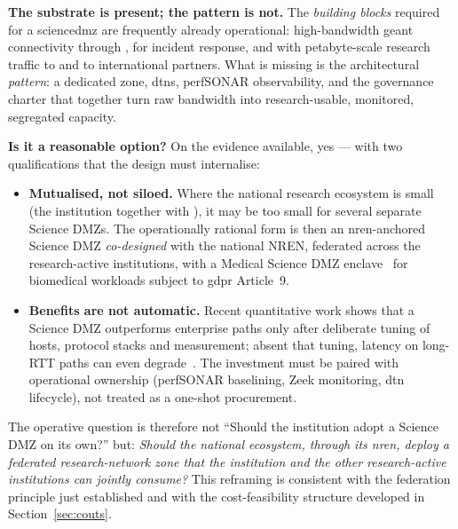 \medskip
\noindent\textbf{The substrate is present; the pattern is not.}
The \emph{building blocks} required for a \gls{sciencedmz} are
frequently already operational: high-bandwidth \gls{geant}
connectivity through ,  for
incident response, and  with
petabyte-scale research traffic to 
and to international partners.
What is missing is the architectural \emph{pattern}: a dedicated
zone, \gls{dtn}s, perfSONAR observability, and the governance
charter that together turn raw bandwidth into research-usable,
monitored, segregated capacity.

\medskip
\noindent\textbf{Is it a reasonable option?} On the
evidence available, yes --- with two qualifications that the
design must internalise:

\begin{itemize}[nosep]
    \item \textbf{Mutualised, not siloed.} Where the national
    research ecosystem is small (the institution together with
    ), it may be too small for
    several separate Science DMZs. The operationally rational
    form is then an \gls{nren}-anchored Science DMZ \emph{co-designed}
    with the national NREN, federated across the research-active
    institutions, with a Medical Science DMZ
    enclave~\cite{medical-sdmz} for biomedical workloads
    subject to \gls{gdpr} Article~9.
    \item \textbf{Benefits are not automatic.} Recent
    quantitative work shows that a Science DMZ outperforms
    enterprise paths only after deliberate tuning of hosts,
    protocol stacks and measurement; absent that tuning,
    latency on long-RTT paths can even
    degrade~\cite{sciencedmz-perf}. The investment must be
    paired with operational ownership (perfSONAR baselining,
    Zeek monitoring, \gls{dtn} lifecycle), not treated as a
    one-shot procurement.
\end{itemize}

The operative question is therefore not ``Should the
institution adopt a Science DMZ on its own?'' but: \emph{Should
the national ecosystem, through its \gls{nren}, deploy a federated
research-network zone that the institution and the other
research-active institutions can jointly consume?}
This reframing is consistent with the federation principle just
established and with the cost-feasibility structure developed in
Section~\ref{sec:couts}.

